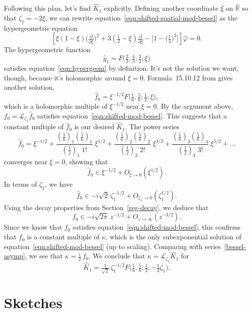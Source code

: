 \documentclass{article}
\theoremstyle{plain}
\newcommand{\R}{\mathbb{R}}
\newcommand{\laplace}{\mathcal{L}}
\begin{document}
Following this plan, let's find $\hat{K}_1$ explicitly. Defining another coordinate $\xi$ on $\hat{\R}$ so that $\zeta_1 = -2\xi$, we can rewrite equation~\ref{eqn:shifted-spatial-mod-bessel} as the hypergeometric equation
\begin{equation}\label{eqn:hypergeom}
\left[\xi(1 - \xi) \big(\tfrac{\partial}{\partial \xi}\big)^2 + 3(\tfrac{1}{2} - \xi) \tfrac{\partial}{\partial \xi} - \big[1 - \big(\tfrac{1}{3}\big)^2\big]\right] \hat{\varphi} = 0.
\end{equation}
The hypergeometric function
\[ \hat{g}_1 = F\big(\tfrac{2}{3}, \tfrac{4}{3}; \tfrac{3}{2}; \xi\big) \]
satisfies equation~\ref{eqn:hypergeom} by definition. It's not the solution we want, though, because it's holomorphic around $\xi = 0$. Formula~15.10.12 from \cite{dlmf} gives another solution,
\[ \hat{f}_0 = \xi^{-1/2} F\big(\tfrac{1}{6}, \tfrac{5}{6}; \tfrac{1}{2}; \xi\big), \]
which is a holomorphic multiple of $\xi^{-1/2}$ near $\xi = 0$. By the argument above, $f_0 = \laplace_{\zeta_1} \hat{f}_0$ satisfies equation~\ref{eqn:shifted-mod-bessel}. This suggests that a constant multiple of $\hat{f}_0$ is our desired $\hat{K}_1$. The power series~\cite[equation~15.2.1]{dlmf}
\[ \hat{f}_0 = \xi^{-1/2} + \frac{(\tfrac{1}{6})_1 (\tfrac{5}{6})_1}{(\tfrac{1}{2})_1 \; 1!}\;\xi^{1/2} + \frac{(\tfrac{1}{6})_2 (\tfrac{5}{6})_2}{(\tfrac{1}{2})_2 \; 2!}\;\xi^{3/2} + \frac{(\tfrac{1}{6})_3 (\tfrac{5}{6})_3}{(\tfrac{1}{2})_3 \; 3!}\;\xi^{5/2} + \ldots \]
converges near $\xi = 0$, showing that
\[ \hat{f}_0 \in \xi^{-1/2} + O_{\xi \to 0}(\xi^{1/2}). \]
In terms of $\zeta_1$, we have
\[ \hat{f}_0 \in -i \sqrt{2}\,\zeta_1^{-1/2} + O_{\zeta_1 \to 0}(\zeta_1^{1/2}). \]
Using the decay properties from Section~\ref{reg-decay}, we deduce that
\[ f_0 \in -i \sqrt{2\pi}\,z^{-1/2} + O_{z \to \infty}(z^{-3/2}). \]
Since we know that $f_0$ satisfies equation~\ref{eqn:shifted-mod-bessel}, this confirms that $f_0$ is a constant multiple of $\kappa$, which is the only subexponential solution of equation~\ref{eqn:shifted-mod-bessel} (up to scaling). Comparing with series~\ref{bessel-asymp}, we see that $\kappa = \tfrac{i}{2}\,f_0$. We conclude that $\kappa = \laplace_{\zeta_1} \hat{K}_1$ for
\[ \hat{K}_1 = \tfrac{1}{\sqrt{2}}\,\zeta_1^{-1/2} F\big(\tfrac{1}{6}, \tfrac{5}{6}; \tfrac{1}{2}; -\tfrac{1}{2}\zeta_1\big). \]
\color{black}
\section{Sketches}
\end{document}
